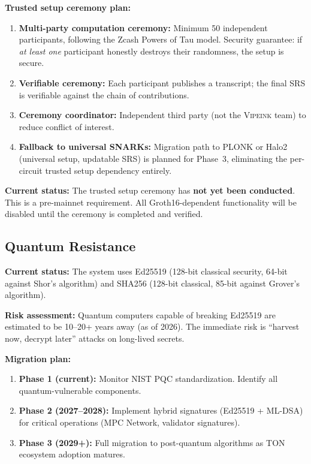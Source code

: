 \documentclass[12pt,a4paper]{article}
\theoremstyle{definition}
\theoremstyle{remark}
\newcommand{\Vipeink}{\textsc{Vipeink}}
\begin{document}
\textbf{Trusted setup ceremony plan:}
\begin{enumerate}[nosep]
    \item \textbf{Multi-party computation ceremony:} Minimum 50 independent participants, following the Zcash Powers of Tau model. Security guarantee: if \emph{at least one} participant honestly destroys their randomness, the setup is secure.
    \item \textbf{Verifiable ceremony:} Each participant publishes a transcript; the final SRS is verifiable against the chain of contributions.
    \item \textbf{Ceremony coordinator:} Independent third party (not the \Vipeink{} team) to reduce conflict of interest.
    \item \textbf{Fallback to universal SNARKs:} Migration path to PLONK or Halo2 (universal setup, updatable SRS) is planned for Phase~3, eliminating the per-circuit trusted setup dependency entirely.
\end{enumerate}

\textbf{Current status:} The trusted setup ceremony has \textbf{not yet been conducted}. This is a pre-mainnet requirement. All Groth16-dependent functionality will be disabled until the ceremony is completed and verified.

\subsection{Quantum Resistance}
\label{sec:quantum-resistance}

\textbf{Current status:} The system uses Ed25519 (128-bit classical security, 64-bit against Shor's algorithm) and SHA256 (128-bit classical, 85-bit against Grover's algorithm).

\textbf{Risk assessment:} Quantum computers capable of breaking Ed25519 are estimated to be 10--20+ years away (as of 2026). The immediate risk is ``harvest now, decrypt later'' attacks on long-lived secrets.

\textbf{Migration plan:}
\begin{enumerate}[nosep]
    \item \textbf{Phase 1 (current):} Monitor NIST PQC standardization. Identify all quantum-vulnerable components.
    \item \textbf{Phase 2 (2027--2028):} Implement hybrid signatures (Ed25519 + ML-DSA) for critical operations (MPC Network, validator signatures).
    \item \textbf{Phase 3 (2029+):} Full migration to post-quantum algorithms as TON ecosystem adoption matures.
\end{enumerate}
\end{document}

